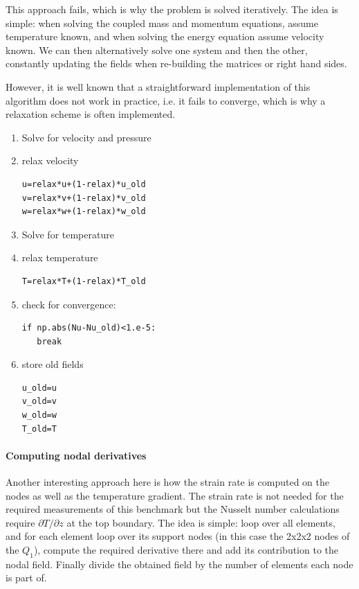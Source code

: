 This approach fails, which is why 
the problem is solved iteratively. The idea is simple: when solving the 
coupled mass and momentum equations, assume temperature known, and when solving the energy equation
assume velocity known. We can then alternatively solve one system and then the other, constantly 
updating the fields when re-building the matrices or right hand sides.

However, it is well known that a straightforward implementation of this algorithm does not 
work in practice, i.e. it fails to converge, which is why a relaxation scheme is often implemented.
\begin{enumerate}
\item Solve for velocity and pressure
\item relax velocity
\begin{lstlisting}
u=relax*u+(1-relax)*u_old
v=relax*v+(1-relax)*v_old
w=relax*w+(1-relax)*w_old
\end{lstlisting}
\item Solve for temperature
\item relax temperature
\begin{lstlisting}
T=relax*T+(1-relax)*T_old
\end{lstlisting}
\item check for convergence:
\begin{lstlisting}
if np.abs(Nu-Nu_old)<1.e-5:
   break
\end{lstlisting}
\item store old fields
\begin{lstlisting}
u_old=u
v_old=v
w_old=w
T_old=T
\end{lstlisting}
\end{enumerate}

\paragraph{Computing nodal derivatives}  
Another interesting approach here is how the strain rate is computed on the nodes as well as
the temperature gradient. The strain rate is not needed for the required measurements of this 
benchmark but the Nusselt number calculations require $\partial T/\partial z$ at the top
boundary.    
The idea is simple: loop over all elements, and for each element loop over its support nodes
(in this case the 2x2x2 nodes of the $Q_1$), compute the required derivative there and add its contribution 
to the nodal field. Finally divide the obtained field by the number of elements each node is 
part of.




